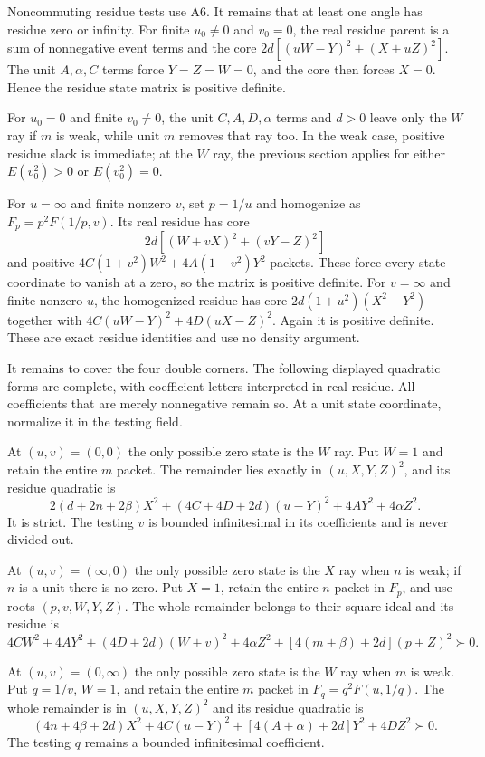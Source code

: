 Noncommuting residue tests use A6. It remains that at least one angle
has residue zero or infinity. For finite $u_0\ne0$ and $v_0=0$,
the real residue parent is a sum of nonnegative event terms and the
core $2d[(uW-Y)^2+(X+uZ)^2]$. The unit $A,\alpha,C$ terms
force $Y=Z=W=0$, and the core then forces $X=0$.
Hence the residue state matrix is positive definite.

For $u_0=0$ and finite $v_0\ne0$, the unit $C,A,D,\alpha$ terms
and $d>0$ leave only the $W$ ray if $m$ is weak, while unit $m$
removes that ray too. In the weak case, positive residue slack is
immediate; at the $W$ ray, the previous section applies for either
$E(v_0^2)>0$ or $E(v_0^2)=0$.

For $u=\infty$ and finite nonzero $v$, set $p=1/u$ and homogenize
as $F_p=p^2F(1/p,v)$. Its real residue has core
\[
 2d[(W+vX)^2+(vY-Z)^2]
\]
and positive $4C(1+v^2)W^2+4A(1+v^2)Y^2$ packets. These
force every state coordinate to vanish at a zero, so the matrix is
positive definite. For $v=\infty$ and finite nonzero $u$, the
homogenized residue has core $2d(1+u^2)(X^2+Y^2)$ together with
$4C(uW-Y)^2+4D(uX-Z)^2$. Again it is positive definite.
These are exact residue identities and use no density argument.

It remains to cover the four double corners. The following displayed
quadratic forms are complete, with coefficient letters interpreted in
real residue. All coefficients that are merely nonnegative remain so.
At a unit state coordinate, normalize it in the testing field.

At $(u,v)=(0,0)$ the only possible zero state is the $W$ ray.
Put $W=1$ and retain the entire $m$ packet. The remainder lies
exactly in $(u,X,Y,Z)^2$, and its residue quadratic is
\[
 2(d+2n+2\beta)X^2+(4C+4D+2d)(u-Y)^2+4AY^2+4\alpha Z^2.
\]
It is strict. The testing $v$ is bounded infinitesimal in its
coefficients and is never divided out.

At $(u,v)=(\infty,0)$ the only possible zero state is the $X$ ray
when $n$ is weak; if $n$ is a unit there is no zero. Put $X=1$,
retain the entire $n$ packet in $F_p$, and use roots $(p,v,W,Y,Z)$.
The whole remainder belongs to their square ideal and its residue is
\[
 4CW^2+4AY^2+(4D+2d)(W+v)^2
                 +4\alpha Z^2+[4(m+\beta)+2d](p+Z)^2\succ0.
\]

At $(u,v)=(0,\infty)$ the only possible zero state is the $W$ ray
when $m$ is weak. Put $q=1/v$, $W=1$, and retain the entire $m$
packet in $F_q=q^2F(u,1/q)$. The whole remainder is in
$(u,X,Y,Z)^2$ and its residue quadratic is
\[
 (4n+4\beta+2d)X^2+4C(u-Y)^2+[4(A+\alpha)+2d]Y^2+4DZ^2\succ0.
\]
The testing $q$ remains a bounded infinitesimal coefficient.

